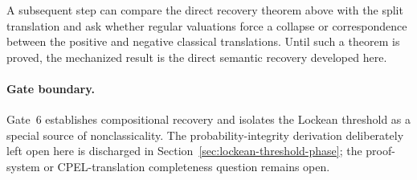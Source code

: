 A subsequent step can compare the direct recovery theorem above with the split
translation and ask whether regular valuations force a collapse or correspondence
between the positive and negative classical translations.  Until such a theorem is
proved, the mechanized result is the direct semantic recovery developed here.

\paragraph{Gate boundary.}
Gate~6 establishes compositional recovery and isolates the Lockean threshold as a
special source of nonclassicality.  The probability-integrity derivation deliberately
left open here is discharged in Section~\ref{sec:lockean-threshold-phase}; the
proof-system or CPEL-translation completeness question remains open.
